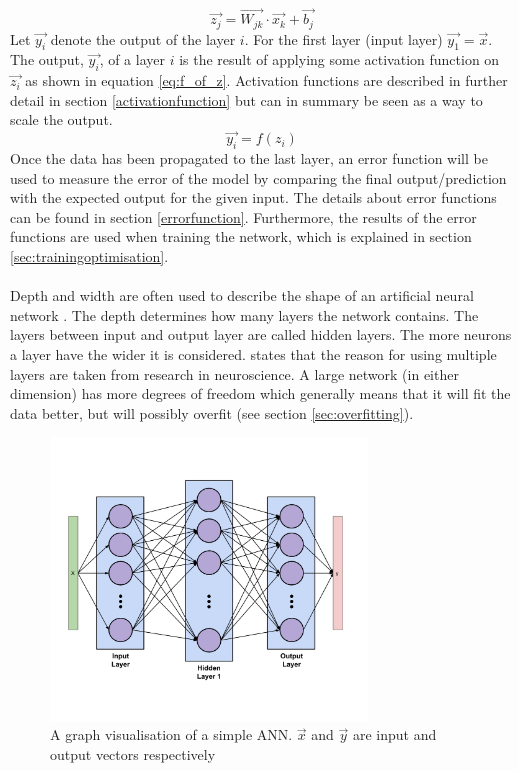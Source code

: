 \begin{equation}\label{eq:z}
    \vec{z_j} = \vec{W_{jk}} \cdot \vec{x_k} + \vec{b_j}
\end{equation}
Let $\vec{y_i}$ denote the output of the layer $i$. For the first layer (input layer) $\vec{y_1}=\vec{x}$. The output, $\vec{y_i}$, of a layer $i$ is the result of applying some activation function on $\vec{z_i}$ as shown in equation \ref{eq:f_of_z}. Activation functions are described in further detail in section \ref{activationfunction} but can in summary be seen as a way to scale the output.
\begin{equation}\label{eq:f_of_z}
    \vec{y_i} = f(z_i)
\end{equation}
Once the data has been propagated to the last layer, an error function will be used to measure the error of the model by comparing the final output/prediction with the expected output for the given input. The details about error functions can be found in section \ref{errorfunction}. Furthermore, the results of the error functions are used when training the network, which is explained in section \ref{sec:trainingoptimisation}. 
\\\\
Depth and width are often used to describe the shape of an artificial neural network \parencite{Goodfellow-et-al-2016}. The depth determines how many layers the network contains. The layers between input and output layer are called hidden layers. The more neurons a layer have the wider it is considered. \parencite{Goodfellow-et-al-2016} states that the reason for using multiple layers are taken from research in neuroscience. A large network (in either dimension) has more degrees of freedom which generally means that it will fit the data better, but will possibly overfit (see section \ref{sec:overfitting}).

\begin{figure}[h]
    \centering
    \includegraphics[width=0.75\textwidth]{figure/ann/simple_ann}
    \caption{A graph visualisation of a simple ANN. $\vec{x}$ and $\vec{y}$ are input and output vectors respectively}
    \label{fig:simple_ann}
\end{figure}

